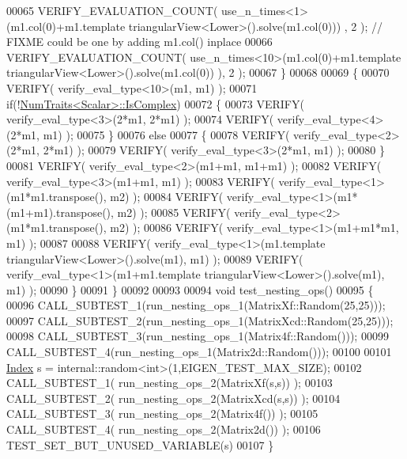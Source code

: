 \begin{DoxyCode}
00065     VERIFY\_EVALUATION\_COUNT( use\_n\_times<1>(m1.col(0)+m1.template triangularView<Lower>().solve(m1.col(0)))
      , 2 ); \textcolor{comment}{// FIXME could be one by adding m1.col() inplace}
00066     VERIFY\_EVALUATION\_COUNT( use\_n\_times<10>(m1.col(0)+m1.template triangularView<Lower>().solve(m1.col(0))
      ), 2 );
00067   \}
00068 
00069   \{
00070     VERIFY( verify\_eval\_type<10>(m1, m1) );
00071     \textcolor{keywordflow}{if}(!\hyperlink{group___core___module_struct_eigen_1_1_num_traits}{NumTraits<Scalar>::IsComplex})
00072     \{
00073       VERIFY( verify\_eval\_type<3>(2*m1, 2*m1) );
00074       VERIFY( verify\_eval\_type<4>(2*m1, m1) );
00075     \}
00076     \textcolor{keywordflow}{else}
00077     \{
00078       VERIFY( verify\_eval\_type<2>(2*m1, 2*m1) );
00079       VERIFY( verify\_eval\_type<3>(2*m1, m1) );
00080     \}
00081     VERIFY( verify\_eval\_type<2>(m1+m1, m1+m1) );
00082     VERIFY( verify\_eval\_type<3>(m1+m1, m1) );
00083     VERIFY( verify\_eval\_type<1>(m1*m1.transpose(), m2) );
00084     VERIFY( verify\_eval\_type<1>(m1*(m1+m1).transpose(), m2) );
00085     VERIFY( verify\_eval\_type<2>(m1*m1.transpose(), m2) );
00086     VERIFY( verify\_eval\_type<1>(m1+m1*m1, m1) );
00087 
00088     VERIFY( verify\_eval\_type<1>(m1.template triangularView<Lower>().solve(m1), m1) );
00089     VERIFY( verify\_eval\_type<1>(m1+m1.template triangularView<Lower>().solve(m1), m1) );
00090   \}
00091 \}
00092 
00093 
00094 \textcolor{keywordtype}{void} test\_nesting\_ops()
00095 \{
00096   CALL\_SUBTEST\_1(run\_nesting\_ops\_1(MatrixXf::Random(25,25)));
00097   CALL\_SUBTEST\_2(run\_nesting\_ops\_1(MatrixXcd::Random(25,25)));
00098   CALL\_SUBTEST\_3(run\_nesting\_ops\_1(Matrix4f::Random()));
00099   CALL\_SUBTEST\_4(run\_nesting\_ops\_1(Matrix2d::Random()));
00100 
00101   \hyperlink{namespace_eigen_a62e77e0933482dafde8fe197d9a2cfde}{Index} s = internal::random<int>(1,EIGEN\_TEST\_MAX\_SIZE);
00102   CALL\_SUBTEST\_1( run\_nesting\_ops\_2(MatrixXf(s,s)) );
00103   CALL\_SUBTEST\_2( run\_nesting\_ops\_2(MatrixXcd(s,s)) );
00104   CALL\_SUBTEST\_3( run\_nesting\_ops\_2(Matrix4f()) );
00105   CALL\_SUBTEST\_4( run\_nesting\_ops\_2(Matrix2d()) );
00106   TEST\_SET\_BUT\_UNUSED\_VARIABLE(s)
00107 \}
\end{DoxyCode}
